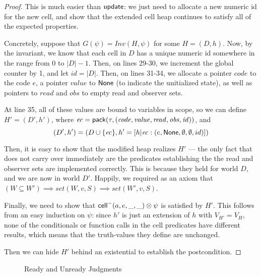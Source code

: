\begin{proof}
This is much easier than $\mathsf{update}$: we just need to allocate a new
numeric id for the new cell, and show that the extended cell heap
continues to satisfy all of the expected properties.

Concretely, suppose that $G(\psi) = \mathit{Inv}{(H, \psi)}$ for some
$H = (D,h)$. Now, by the invariant, we know that each cell in $D$ has 
a unique numeric id somewhere in the range from $0$ to $|D|-1$. Then,
on lines 29-30, we increment the global counter by 1, and let $id = |D|$. 
Then, on lines 31-34, we allocate a pointer $\mathit{code}$ to the code $e$, a pointer
$\mathit{value}$ to $\mathsf{None}$ (to indicate the unitialized state), as well as pointers to 
$\mathit{read}$ and $\mathit{obs}$ to empty read and observer sets. 

At line 35, all of these values are bound to variables in scope, so we
can define $H' = (D',h')$, where $\mathit{ec} = \mathsf{pack}({\tau}, {\mathit{(code, value, read, obs, id)}})$, 
and 
\begin{displaymath}
(D',h') = (D \cup \{{\mathit{ec}}\}, h' = [h|\mathit{ec}: (e, \mathsf{None}, \emptyset, \emptyset, id)])
\end{displaymath}

Then, it is easy to show that the modified heap realizes $H'$ --- the
only fact that does not carry over immediately are the predicates
establishing the the read and observer sets are implemented
correctly. This is because they held for world $D$, and we are now in
world $D'$. Happily, we required as an axiom that $(W \subseteq W')
\implies \mathit{set}(W, v, S) \implies \mathit{set}(W', v, S)$.

Finally, we need to show that $\mathsf{cell}^{-}({a}, {e}, {\_}, {\_}) \otimes \psi$ is
satisfied by $H'$. This follows from an easy induction on $\psi$:
since $h'$ is just an extension of $h$ with $V_{H'} = V_H$, none
of the conditionals or function calls in the cell predicates have
different results, which means that the truth-values they define
are unchanged. 

Then we can hide $H'$ behind an existential to establish the postcondition. 
\end{proof}

\begin{figure}
\mbox{}
\caption{Ready and Unready Judgments}
\label{readiness}
\end{figure}

